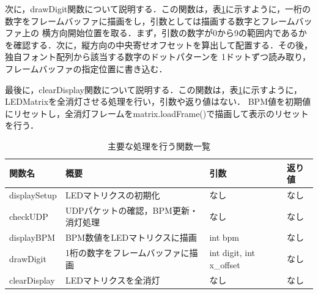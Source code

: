 \documentclass[lualatex,article,paper=a4paper,jafontsize=11.5pt,jafontscale=1.05]{jlreq}
\begin{document}
次に，drawDigit関数について説明する．この関数は，表\ref{tab:func1}に示すように，一桁の数字をフレームバッファに描画をし，引数としては描画する数字とフレームバッファ上の
横方向開始位置を取る．まず，引数の数字が0から9の範囲内であるかを確認する．次に，縦方向の中央寄せオフセットを算出して配置する．その後，独自フォント配列から該当する数字のドットパターンを
1ドットずつ読み取り，フレームバッファの指定位置に書き込む．

最後に，clearDisplay関数について説明する．この関数は，表\ref{tab:func1}に示すように，LEDMatrixを全消灯させる処理を行い，引数や返り値はない．
BPM値を初期値にリセットし，全消灯フレームをmatrix.loadFrame()で描画して表示のリセットを行う．\par




\begin{table}[h]
  \vspace{-1em}
  \caption{主要な処理を行う関数一覧}
  \centering
  \label{tab:func1}
  \begin{tabular}{llll}
  \hline
  \textbf{関数名} & \textbf{概要} & \textbf{引数} & \textbf{返り値}\\
  \hline
  displaySetup & LEDマトリクスの初期化 & なし & なし\\
  \hline
  checkUDP & UDPパケットの確認，BPM更新・消灯処理 & なし & なし\\
  \hline
  displayBPM & BPM数値をLEDマトリクスに描画 & int bpm & なし\\
  \hline
  drawDigit & 1桁の数字をフレームバッファに描画 & int digit, int x\_offset & なし\\
  \hline
  clearDisplay & LEDマトリクスを全消灯 & なし & なし\\
  \hline
  \end{tabular}
\end{table}
\end{document}
